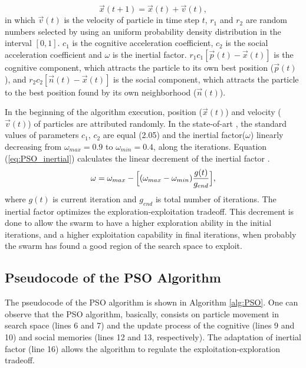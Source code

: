 \begin{equation}\label{eq:PSO_position}
\vec x(t+1) = \vec x(t) + \vec v(t),
\end{equation}
in which $\vec v(t)$ is the velocity of particle in time step $t$, $r_1$ and $r_2$ are random numbers selected by using an uniform probability density distribution in the interval $[0,1]$. $c_1$ is the cognitive acceleration coefficient, $c_2$ is the social acceleration coefficient and $\omega$ is the inertial factor. $r_1c_1[\vec p(t) - \vec x(t)]$ is the cognitive component, which attracts the particle to its own best position ($\vec p(t)$), and $r_2c_2[\vec n(t) - \vec x(t)]$ is the social component, which attracts the particle to the best position found by its own neighborhood ($\vec n(t)$).

In the beginning of the algorithm execution, position ($\vec x(t)$) and velocity ($\vec v(t)$) of particles are attributed randomly. In the state-of-art \cite{PSO:Shi} \cite{PSO:Bratton2007}, the standard values of parameters $c_1$, $c_2$ are equal (2.05) and the inertial factor($\omega$) linearly decreasing from $\omega_{max} = 0.9$ to $\omega_{min} = 0.4$, along the iterations. Equation (\ref{eq:PSO_inertial}) calculates the linear decrement of the inertial factor \cite{PSO:Shi}.
\begin{equation}\label{eq:PSO_inertial}
\omega = \omega_{max} - \Bigl[(\omega_{max} - \omega_{min})\frac{g(t)}{g_{end}}\Bigr],
\end{equation}
where $g(t)$ is current iteration and $g_{end}$ is total number of iterations. The inertial factor optimizes the exploration-exploitation tradeoff. This decrement is done to allow the swarm to have a higher exploration ability in the initial iterations, and a higher exploitation capability in final iterations, when probably the swarm has found a good region of the search space to exploit.

\subsection{Pseudocode of the PSO Algorithm}
The pseudocode of the PSO algorithm is shown in Algorithm \ref{alg:PSO}. One can observe that the PSO algorithm, basically, consists on particle movement in search space (lines 6 and 7) and the update process of the cognitive (lines 9 and 10) and social memories (lines 12 and 13, respectively). The adaptation of inertial factor (line 16) allows the algorithm to regulate the exploitation-exploration tradeoff.

